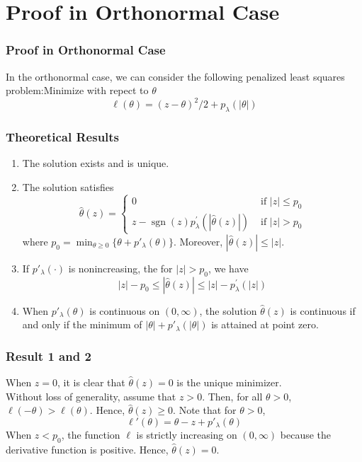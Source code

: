 \documentclass{beamer}
\begin{document}
\section{Proof in Orthonormal Case}
\begin{frame}
	\frametitle{Proof in Orthonormal Case}
	In the orthonormal case, we can consider the following penalized least squares problem:Minimize with
	repect to $\theta$
	\[\ell(\theta) = (z-\theta)^2/2 + p_\lambda(|\theta|)\]

\end{frame}
\begin{frame}
	\frametitle{Theoretical Results}
	\begin{enumerate}
    \item The solution exists and is unique.
		\item The solution satisfies
		\[\hat{\theta}(z)=\left\{\begin{array}{ll}
			0 & \text { if }|z| \leq p_{0} \\
			z-\operatorname{sgn}(z) p_{\lambda}^{\prime}(|\hat{\theta}(z)|) & \text { if }|z|>p_{0}
			\end{array}\right.\]
		where $p_0 = \min_{\theta \geq 0}\{\theta + p'_\lambda(\theta)\}$. Moreover, $|\hat \theta(z)|\leq|z|$.
    \item If $p'_\lambda(\cdot)$ is nonincreasing, the for $|z| > p_0$, we have 
    \[|z|-p_{0} \leq|\hat{\theta}(z)| \leq|z|-p_{\lambda}^{\prime}(|z|) \]
    \item When $p'_\lambda(\theta)$ is continuous on $\left(0,\infty \right)$, the solution $\hat \theta(z)$
    is continuous if and only if the minimum of $|\theta|+p'_\lambda(|\theta|)$ is attained at point zero.
    
	\end{enumerate}
\end{frame}
\begin{frame}
	\frametitle{Result 1 and 2}
  When $z = 0$, it is clear that
  $\hat \theta(z) = 0$ is the unique minimizer.
  ~\\
  Without loss of generality, assume
  that $ z > 0$. Then, for all $\theta > 0$, $\ell(-\theta)>\ell(\theta)$. Hence, $\hat \theta(z) \geq 0 $. Note
  that for $\theta> 0$,
  \[\ell'(\theta) = \theta -z +p'_\lambda(\theta)\]
  When $z < p_0$, the function $\ell$ is strictly increasing on $\left( 0,\infty \right )$ because
the derivative function is positive. Hence, $\hat \theta(z)=0$. 
\end{frame}
\end{document}
